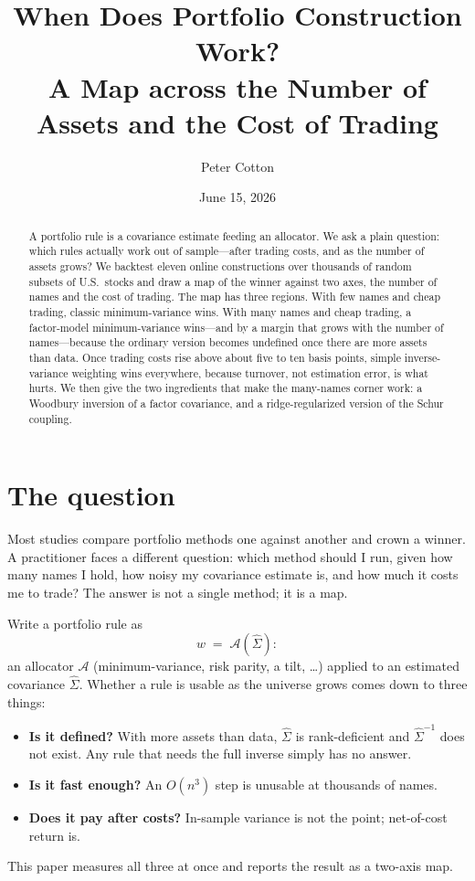 \documentclass[11pt]{article}
\title{When Does Portfolio Construction Work?\\
       A Map across the Number of Assets and the Cost of Trading}
\author{Peter Cotton}
\date{June 15, 2026}
\newcommand{\Sig}{\Sigma}
\begin{document}
\maketitle

\begin{abstract}
A portfolio rule is a covariance estimate feeding an allocator. We ask a plain
question: which rules actually work out of sample---after trading costs, and as
the number of assets grows? We backtest eleven online constructions over
thousands of random subsets of U.S.\ stocks and draw a map of the winner against
two axes, the number of names and the cost of trading. The map has three regions.
With few names and cheap trading, classic minimum-variance wins. With
many names and cheap trading, a factor-model minimum-variance wins---and
by a margin that grows with the number of names---because the ordinary version
becomes undefined once there are more assets than data. Once trading
costs rise above about five to ten basis points, simple inverse-variance
weighting wins everywhere, because turnover, not estimation error, is what hurts.
We then give the two ingredients that make the many-names corner work: a Woodbury
inversion of a factor covariance, and a ridge-regularized version of the Schur
coupling.
\end{abstract}

\section{The question}
Most studies compare portfolio methods one against another and crown a winner. A
practitioner faces a different question: which method should I run, given
how many names I hold, how noisy my covariance estimate is, and how much it costs
me to trade? The answer is not a single method; it is a map.

Write a portfolio rule as
\begin{equation}
  w \;=\; \mathcal{A}\!\left(\widehat{\Sig}\right):
\end{equation}
an allocator $\mathcal{A}$ (minimum-variance, risk parity, a tilt, \dots)
applied to an estimated covariance $\widehat{\Sig}$. Whether a rule is
usable as the universe grows comes down to three things:
\begin{itemize}
  \item \textbf{Is it defined?} With more assets than data, $\widehat{\Sig}$ is
    rank-deficient and $\widehat{\Sig}^{-1}$ does not exist. Any rule that needs
    the full inverse simply has no answer.
  \item \textbf{Is it fast enough?} An $O(n^3)$ step is unusable at thousands of
    names.
  \item \textbf{Does it pay after costs?} In-sample variance is not the point;
    net-of-cost return is.
\end{itemize}
This paper measures all three at once and reports the result as a two-axis map.
\end{document}
